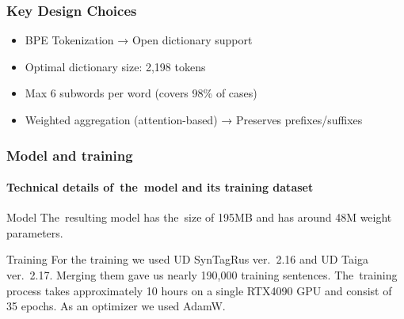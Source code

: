 \documentclass{beamer}
\begin{document}
\begin{frame}
\frametitle{Key Design Choices}
\begin{itemize}
\item BPE Tokenization → Open dictionary support
\item Optimal dictionary size: 2,198 tokens
\item Max 6 subwords per word (covers 98\% of cases)
\item Weighted aggregation (attention-based) → Preserves prefixes/suffixes
\end{itemize}
\end{frame}


\begin{frame}
\frametitle{Model and training}
\framesubtitle{  Technical details of~the~model and its training dataset}
\begin{block}{Model}
The~resulting model has the~size of 195MB and has around 48M weight parameters.
\end{block}
\begin{block}{Training}
For the training we used UD SynTagRus ver.~2.16 and UD Taiga ver.~2.17.
Merging them gave us nearly 190,000 training sentences.
The~training process takes approximately 10 hours on a single RTX4090 GPU and consist of 35 epochs.
As an optimizer we used AdamW.
\end{block}
\end{frame}
\end{document}
